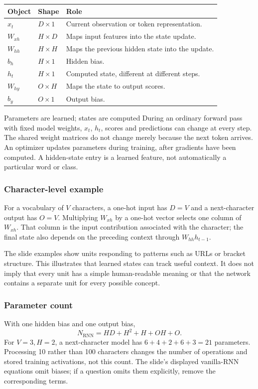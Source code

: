 \documentclass[11pt]{article}
\begin{document}
\begin{longtable}{@{}P{.20\textwidth}P{.20\textwidth}P{.50\textwidth}@{}}
\toprule Object & Shape & Role\\\midrule\endhead
$x_t$ & $D\times1$ & Current observation or token representation.\\
$W_{xh}$ & $H\times D$ & Maps input features into the state update.\\
$W_{hh}$ & $H\times H$ & Maps the previous hidden state into the update.\\
$b_h$ & $H\times1$ & Hidden bias.\\
$h_t$ & $H\times1$ & Computed state, different at different steps.\\
$W_{hy}$ & $O\times H$ & Maps the state to output scores.\\
$b_y$ & $O\times1$ & Output bias.\\\bottomrule
\end{longtable}
\begin{keyidea}{Parameters are learned; states are computed}
During an ordinary forward pass with fixed model weights, $x_t$, $h_t$, scores and predictions can change at every step. The shared weight matrices do not change merely because the next token arrives. An optimizer updates parameters during training, after gradients have been computed. A hidden-state entry is a learned feature, not automatically a particular word or class.
\end{keyidea}

\subsubsection{Character-level example}
For a vocabulary of $V$ characters, a one-hot input has $D=V$ and a next-character output has $O=V$. Multiplying $W_{xh}$ by a one-hot vector selects one column of $W_{xh}$. That column is the input contribution associated with the character; the final state also depends on the preceding context through $W_{hh}h_{t-1}$.

The slide examples show units responding to patterns such as URLs or bracket structure. This illustrates that learned states can track useful context. It does not imply that every unit has a simple human-readable meaning or that the network contains a separate unit for every possible concept.

\subsubsection{Parameter count}
With one hidden bias and one output bias,
\[
N_{\mathrm{RNN}}=HD+H^2+H+OH+O.
\]
For $V=3,H=2$, a next-character model has $6+4+2+6+3=21$ parameters. Processing 10 rather than 100 characters changes the number of operations and stored training activations, not this count. The slide's displayed vanilla-RNN equations omit biases; if a question omits them explicitly, remove the corresponding terms.
\end{document}
